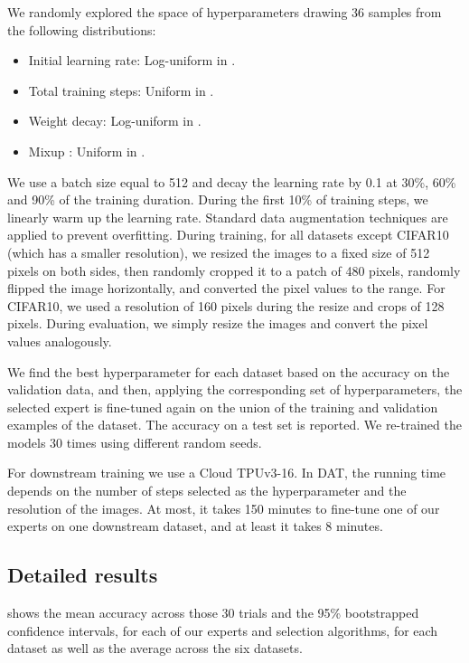 \documentclass{article}
\begin{document}
We randomly explored the space of hyperparameters drawing 36 samples from the following distributions:
\begin{itemize}
    \item Initial learning rate: Log-uniform in . 
    \item Total training steps: Uniform in . 
    \item Weight decay: Log-uniform in .
    \item Mixup : Uniform in .
\end{itemize}
We use a batch size equal to 512 and decay the learning rate by 0.1 at 30\%, 60\% and 90\% 
of the training duration. During the first 10\% of
training steps, we linearly warm up the learning rate.
Standard data augmentation techniques are applied to prevent overfitting. 
During training, for all datasets except CIFAR10 (which has a smaller resolution),
we resized the images to a fixed size of 512 pixels on both sides, then randomly cropped
it to a patch of 480 pixels, randomly flipped the image horizontally, and converted the 
pixel values to the  range. For CIFAR10, we used a resolution of 160 pixels
during the resize and crops of 128 pixels. During evaluation, we simply resize the images
and convert the pixel values analogously.

We find the best hyperparameter for each dataset based on the accuracy on
the validation data, and then, applying the corresponding set of hyperparameters, 
the selected expert is fine-tuned again on the union of the training and validation
examples of the dataset. The accuracy on a test set is reported. We re-trained the models 
30 times using different random seeds. 

For downstream training we use a Cloud TPUv3-16. In DAT, the running time
depends on the number of steps selected as the hyperparameter and the resolution of
the images. At most, it takes 150 minutes to fine-tune one of our experts on one
downstream dataset, and at least it takes 8 minutes.

\subsection{Detailed results}

 shows the mean accuracy across those 30 trials and the 
95\% bootstrapped confidence intervals, for each of our experts and selection
algorithms, for each dataset as well as the average across the six datasets.
\end{document}
